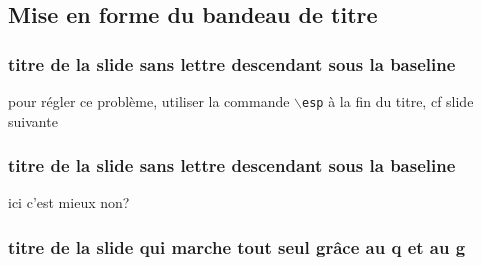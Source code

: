 \subsection{Mise en forme du bandeau de titre}
\begin{frame}
\frametitle{titre de la slide sans lettre descendant sous la baseline}
pour régler ce problème, utiliser la commande \texttt{$\backslash$esp} à la fin du titre, cf slide suivante
\end{frame}


\begin{frame}
\frametitle{titre de la slide sans lettre descendant sous la baseline\esp}
ici c'est mieux non?
\end{frame}


\begin{frame}[fragile]
\frametitle{titre de la slide qui marche tout seul grâce au q et au g}
\end{frame}
